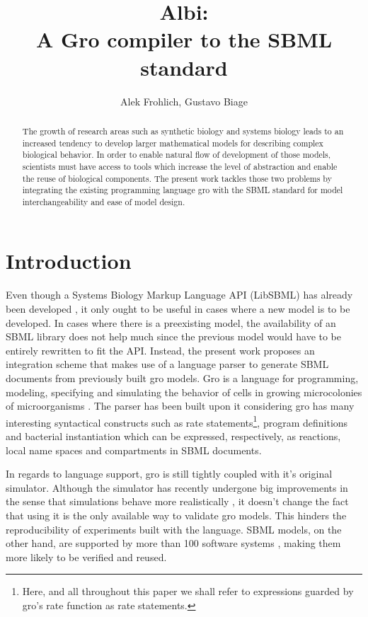 \documentclass[12pt]{article}
\title{Albi:\\ A Gro compiler to the SBML standard}
\author{Alek Frohlich\inst{1}, Gustavo Biage\inst{1}}
\begin{document}
\maketitle
\begin{abstract}


    The growth of research areas such as synthetic biology and systems biology leads to an increased tendency to develop larger mathematical models for describing complex biological behavior. In order to enable natural flow of development of those models, scientists must have access to tools which increase the level of abstraction and enable the reuse of biological components. The present work tackles those two problems by integrating the existing programming language gro with the SBML standard for model interchangeability and ease of model design.


\end{abstract}
\section{Introduction}


    Even though a Systems Biology Markup Language API (LibSBML) has already been developed \cite{Bornstein2008}, it only ought to be useful in cases where a new model is to be developed. In cases where there is a preexisting model, the availability of an SBML library does not help much since the previous model would have to be entirely rewritten to fit the API. Instead, the present work proposes an integration scheme that makes use of a language parser to generate SBML documents from previously built gro models. Gro is a language for programming, modeling, specifying and simulating the behavior of cells in growing microcolonies of microorganisms \cite{Jang2012}. The parser has been built upon it considering gro has many interesting syntactical constructs such as rate statements\footnote{Here, and all throughout this paper we shall refer to expressions guarded by gro's rate function as rate statements.}, program definitions and bacterial instantiation which can be expressed, respectively, as reactions, local name spaces and compartments in SBML documents.
    
    In regards to language support, gro is still tightly coupled with it's original simulator. Although the simulator has recently undergone big improvements in the sense that simulations behave more realistically \cite{Gutirrez2017}, it doesn't change the fact that using it is the only available way to validate gro models. This hinders the reproducibility of experiments built with the language. SBML models, on the other hand, are supported by more than 100 software systems \cite{Hucka2007}, making them more likely to be verified and reused.
    
\end{document}
